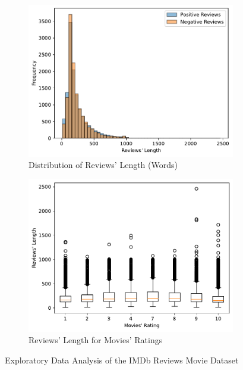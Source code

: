 \begin{figure}
    \vspace{1cm}

    \begin{subfigure}{0.48\textwidth}
        \centering
        \includegraphics[width=\linewidth]{figures/train_lengths.pdf}
        \caption{Distribution of Reviews' Length (Words)}
        \label{fig:lengths}
    \end{subfigure}
    \begin{subfigure}{0.48\textwidth}
        \centering
        \includegraphics[width=\linewidth]{figures/train_lengths_ratings.pdf}
        \caption{Reviews' Length for Movies' Ratings}
        \label{fig:lengths_ratings}
    \end{subfigure}

    \caption{Exploratory Data Analysis of the IMDb Reviews Movie Dataset \cite{maas2011data}}
    \label{fig:descriptive}
\end{figure}

